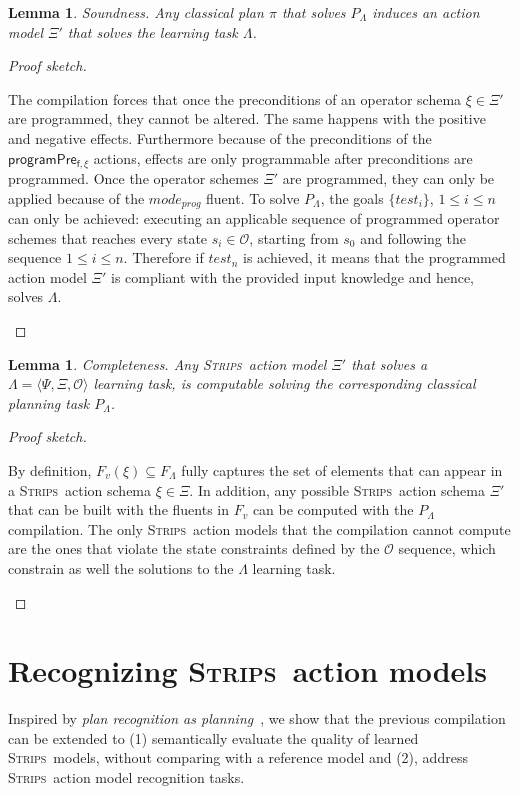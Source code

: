 \documentclass{article}
\newcommand{\tup}[1]{{\langle #1 \rangle}}
\newcommand{\strips}{\textsc{Strips}}     %
\newtheorem{lemma}[theorem]{Lemma}
\begin{document}
\begin{lemma}
Soundness. Any classical plan $\pi$ that solves $P_{\Lambda}$ induces an action model $\Xi'$ that solves the learning task $\Lambda$.
\end{lemma}

\begin{proof}[Proof sketch]
\begin{small}
The compilation forces that once the preconditions of an operator schema $\xi \in \Xi'$ are programmed, they cannot be altered. The same happens with the positive and negative effects. Furthermore because of the preconditions of the $\mathsf{programPre_{f,\xi}}$ actions, effects are only programmable after preconditions are programmed. Once the operator schemes $\Xi'$ are programmed, they can only be applied because of the $mode_{prog}$ fluent. To solve $P_{\Lambda}$, the goals $\{test_i\}$, {\small $1\leq i\leq n$} can only be achieved: executing an applicable sequence of programmed operator schemes that reaches every state $s_i\in\mathcal{O}$, starting from $s_0$ and following  the sequence {\small $1\leq i\leq n$}. Therefore if $test_n$ is achieved, it means that the programmed action model $\Xi'$ is compliant with the provided input knowledge and hence, solves $\Lambda$.
\end{small}
\end{proof}


\begin{lemma}
Completeness. Any \strips\ action model $\Xi'$ that solves a $\Lambda=\tup{\Psi,\Xi,\mathcal{O}}$ learning task, is computable solving the corresponding classical planning task $P_{\Lambda}$.
\end{lemma}

\begin{proof}[Proof sketch]
\begin{small}
By definition, $F_v(\xi)\subseteq F_\Lambda$ fully captures the set of elements that can appear in a \strips\ action schema $\xi\in\Xi$. In addition, any possible \strips\ action schema $\Xi'$ that can be built with the fluents in $F_v$ can be computed  with the $P_{\Lambda}$ compilation. The only \strips\ action models that the compilation cannot compute are the ones that violate the state constraints defined by the $\mathcal{O}$ sequence, which constrain as well the solutions to the $\Lambda$ learning task.
\end{small}
\end{proof}


\section{Recognizing \strips\ action models}
Inspired by {\em plan recognition as planning}~\cite{ramirez2009plan}, we show that the previous compilation can be extended to (1) semantically evaluate the quality of learned \strips\ models, without comparing with a reference model and (2), address \strips\ action model recognition tasks.
\end{document}
